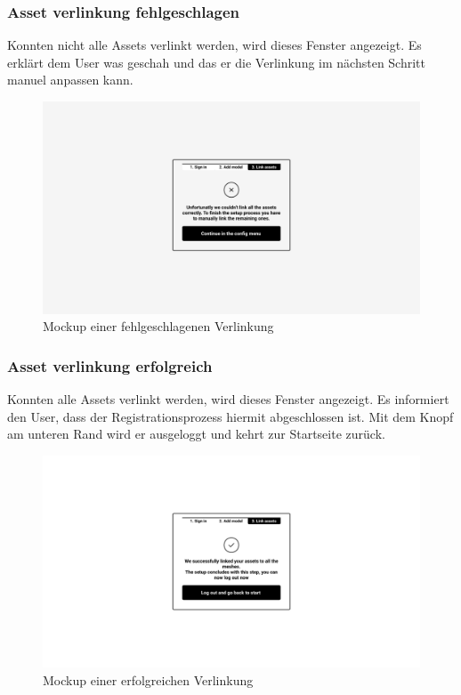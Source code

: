 \subsubsection{Asset verlinkung fehlgeschlagen}
Konnten nicht alle Assets verlinkt werden, wird dieses Fenster angezeigt. Es erklärt dem User was geschah und das er die Verlinkung im nächsten Schritt manuel anpassen kann.
\begin{figure}[H]
  \centering
  \includegraphics[width=1\textwidth]{./mockups/register/redirect.pdf}
  \caption[{Mockup einer fehlgeschlagenen Verlinkung}]{Mockup einer fehlgeschlagenen Verlinkung}
  \label{fig:mck-redirect}
\end{figure}
\pagebreak
\subsubsection{Asset verlinkung erfolgreich}
Konnten alle Assets verlinkt werden, wird dieses Fenster angezeigt. Es informiert den User, dass der Registrationsprozess hiermit abgeschlossen ist. Mit dem Knopf am unteren Rand wird er ausgeloggt und kehrt zur Startseite zurück.
\begin{figure}[H]
  \centering
  \includegraphics[width=1\textwidth]{./mockups/register/all_success.pdf}
  \caption[{Mockup einer erfolgreichen Verlinkung}]{Mockup einer erfolgreichen Verlinkung}
  \label{fig:mck-all_success}
\end{figure}
\pagebreak
